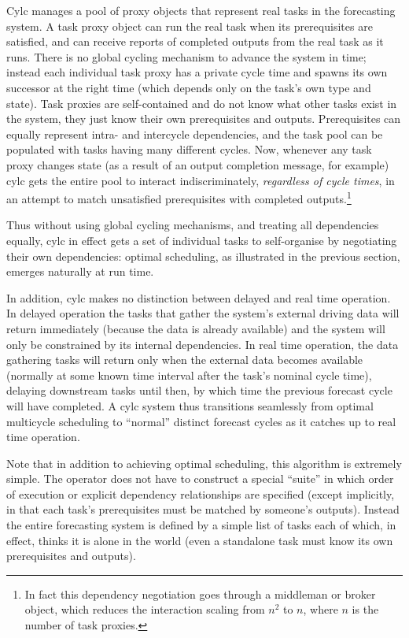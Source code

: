 \documentclass[11pt,a4paper]{article}
\begin{document}
Cylc manages a pool of proxy objects that represent real tasks in the
forecasting system. A task proxy object can run the real task when its
prerequisites are satisfied, and can receive reports of completed
outputs from the real task as it runs. There is no global cycling
mechanism to advance the system in time; instead each individual task
proxy has a private cycle time and spawns its own successor at the right
time (which depends only on the task's own type and state). Task proxies
are self-contained and do not know what other tasks exist in the system,
they just know their own prerequisites and outputs.  Prerequisites can
equally represent intra- and intercycle dependencies, and the task pool
can be populated with tasks having many different cycles. Now,
whenever any task proxy changes state (as a result of an output
completion message, for example) cylc gets the entire pool to interact
indiscriminately, {\em regardless of cycle times}, in an attempt to
match unsatisfied prerequisites with completed outputs.\footnote{In fact
this dependency negotiation goes through a middleman or broker object,
which reduces the interaction scaling from $n^2$ to $n$, where $n$ is
the number of task proxies.} 

Thus without using global cycling mechanisms, and treating all
dependencies equally, cylc in effect gets a set of individual tasks to
self-organise by negotiating their own dependencies: optimal scheduling,
as illustrated in the previous section, emerges naturally at run time.

In addition, cylc makes no distinction between delayed and real time
operation. In delayed operation the tasks that gather the system's
external driving data will return immediately (because the data is
already available) and the system will only be constrained by its
internal dependencies. In real time operation, the data gathering tasks
will return only when the external data becomes available (normally at
some known time interval after the task's nominal cycle time), delaying
downstream tasks until then, by which time the previous forecast cycle
will have completed. A cylc system thus transitions seamlessly from
optimal multicycle scheduling to ``normal'' distinct forecast cycles as
it catches up to real time operation.

Note that in addition to achieving optimal scheduling, this algorithm is
extremely simple. The operator does not have to construct a special
``suite'' in which order of execution or explicit dependency
relationships are specified (except implicitly, in that each task's
prerequisites must be matched by someone's outputs). Instead the entire
forecasting system is defined by a simple list of tasks each of which,
in effect, thinks it is alone in the world (even a standalone task must
know its own prerequisites and outputs).
\end{document}
